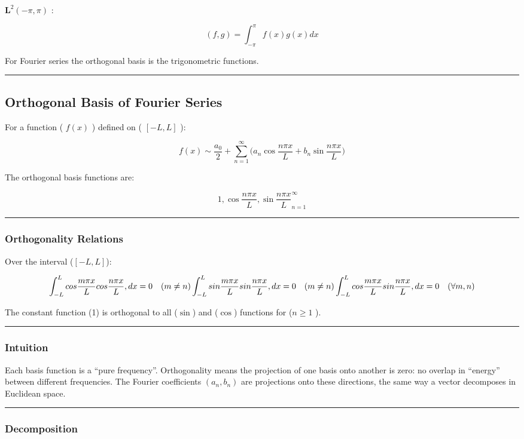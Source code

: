\(\mathbf{L}^2(-\pi,\pi)\) :

\[
(f,g)=\int_{-\pi}^{\pi}f(x)g(x)dx
\]

For Fourier series the orthogonal basis is the trigonometric functions.

\hrule

\subsection{Orthogonal Basis of Fourier Series}

For a function ( \(f(x)\) ) defined on ( \([-L, L]\) ):

\[
f(x) \sim \frac{a_0}{2} + \sum_{n=1}^{\infty} \big(a_n \cos\frac{n\pi x}{L} + b_n \sin\frac{n\pi x}{L}\big)
\]

The orthogonal basis functions are:

\[
{ 1, \cos\frac{n\pi x}{L}, \sin\frac{n\pi x}{L} }_{n=1}^{\infty}
\]

\hrule

\subsubsection{Orthogonality Relations}

Over the interval (\([-L, L]\)):

\[
\int_{-L}^{L} cos \frac{m\pi x}{L} cos \frac{n\pi x}{L},dx = 0 \quad (m \ne n)    \\ 
  \int_{-L}^{L} sin \frac{m\pi x}{L} sin \frac{n\pi x}{L},dx = 0 \quad (m \ne n)    \\
  \int_{-L}^{L} cos \frac{m\pi x}{L} sin \frac{n\pi x}{L},dx = 0 \quad (\forall m,n)
\]

The constant function (1) is orthogonal to all (\(\sin\)) and (\(\cos\)) functions for (\( n \ge 1\) ).

\hrule

\subsubsection{Intuition}

Each basis function is a “pure frequency”. Orthogonality means the projection of one basis onto another is zero: no overlap in “energy” between different frequencies. The Fourier coefficients \((a_n, b_n)\) are projections onto these directions, the same way a vector decomposes in Euclidean space.

\hrule

\subsubsection{Decomposition}

